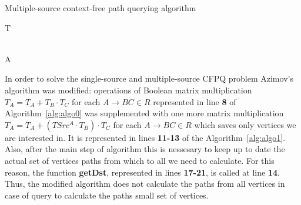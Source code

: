 \begin{algorithm}
\begin{algorithmic}[1]
\caption{Multiple-source context-free path querying algorithm}
\label{alg:algo1}
    

     
    \EndFor

     
        \EndFor
    \EndFor

     
        \EndFor
    \EndWhile
    \State \Return T
\EndFunction

\\

    \EndFor
    \State \Return A
\EndFunction
\end{algorithmic}
\end{algorithm}
In order to solve the single-source and multiple-source CFPQ problem Azimov's algorithm was modified: operations of Boolean matrix multiplication $T_A = T_A + T_B \cdot T_C$ for each $A \rightarrow BC \in R$ represented in line \textbf{8} of Algorithm~\ref{alg:algo0} was supplemented with one more matrix multiplication $T_A = T_A + (TSrc^A \cdot T_B) \cdot T_C$ for each $A \rightarrow BC \in R$ which saves only vertices we are interested in. It is represented in lines \textbf{11-13} of the Algorithm~\ref{alg:algo1}. Also, after the main step of algorithm this is nessesary to keep up to date the actual set of vertices paths from which to all we need to calculate. For this reason, the function \textbf{getDst}, represented in lines \textbf{17-21}, is called at line \textbf{14}. Thus, the modified algorithm does not calculate the paths from all vertices in case of query to calculate the paths small set of vertices.


